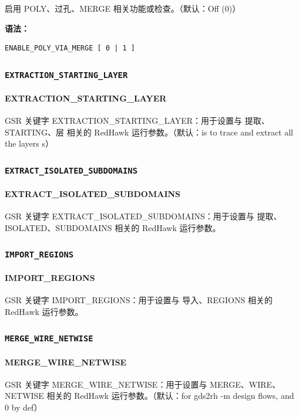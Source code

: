 启用 POLY、过孔、MERGE 相关功能或检查。（默认：Off (0)）

\textbf{语法：}
\begin{lstlisting}
ENABLE_POLY_VIA_MERGE [ 0 | 1 ]
\end{lstlisting}

\subsubsection{\texttt{EXTRACTION_STARTING_LAYER}}
\paragraph*{EXTRACTION_STARTING_LAYER}

GSR 关键字 EXTRACTION_STARTING_LAYER：用于设置与 提取、STARTING、层 相关的 RedHawk 运行参数。（默认：is to trace and extract all the layers s）

\subsubsection{\texttt{EXTRACT_ISOLATED_SUBDOMAINS}}
\paragraph*{EXTRACT_ISOLATED_SUBDOMAINS}

GSR 关键字 EXTRACT_ISOLATED_SUBDOMAINS：用于设置与 提取、ISOLATED、SUBDOMAINS 相关的 RedHawk 运行参数。

\subsubsection{\texttt{IMPORT_REGIONS}}
\paragraph*{IMPORT_REGIONS}

GSR 关键字 IMPORT_REGIONS：用于设置与 导入、REGIONS 相关的 RedHawk 运行参数。

\subsubsection{\texttt{MERGE_WIRE_NETWISE}}
\paragraph*{MERGE_WIRE_NETWISE}

GSR 关键字 MERGE_WIRE_NETWISE：用于设置与 MERGE、WIRE、NETWISE 相关的 RedHawk 运行参数。（默认：for gds2rh -m design flows, and 0 by def）

